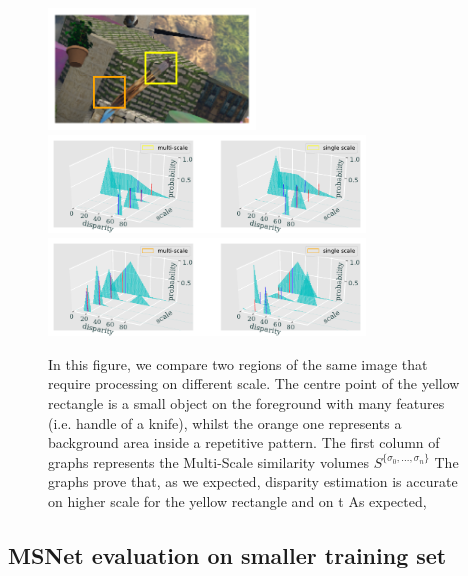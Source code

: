 \documentclass[runningheads]{llncs}
\begin{document}
\begin{figure}[htbp!]
    \begin{center}
        \includegraphics[width=0.49\textwidth]{paper/latex/figures/multiscale_importance_image_patches.pdf}\\
        \includegraphics[width=0.75\textwidth]{paper/latex/figures/multiscale_importance_graph_high_resolution.pdf}\\
        \includegraphics[width=0.75\textwidth]{figures/multiscale_importance_graph_low_resolution.pdf}
    \end{center}
    
    \caption{In this figure, we compare two regions of the same image that require processing on different scale. The centre point of the yellow rectangle is a small object on the foreground with many features (i.e. handle of a knife), whilst the orange one represents a background area inside a repetitive pattern. The first column of graphs represents the Multi-Scale similarity volumes $S^{\{ \sigma_0, ..., \sigma_n \} }$ The graphs prove that, as we expected, disparity estimation is accurate on higher scale for the yellow rectangle and on t As expected,  }
    \label{fig:multiscale_importance}
\end{figure}


\subsection{MSNet evaluation on smaller training set}
\end{document}
